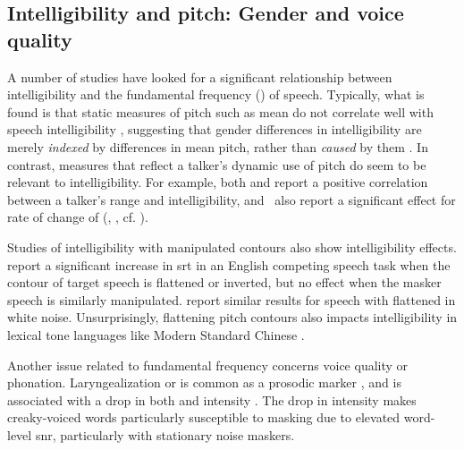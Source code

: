 \subsection[Intelligibility and pitch]{Intelligibility and pitch: Gender and voice quality\label{sec:IntelPitch}}
A number of studies have looked for a significant relationship between intelligibility and the fundamental frequency (\fo) of speech.  Typically, what is found is that static measures of pitch such as mean \fo{} do not correlate well with speech intelligibility \citep[\eg,][]{PichenyEtAl1986, BradlowEtAl1996, HazanMarkham2004, LuCooke2009}, suggesting that gender differences in intelligibility are merely {\em indexed} by differences in mean pitch, rather than {\em caused} by them \citep[cf. discussion in][]{BradlowEtAl1996}.  In contrast, measures that reflect a talker’s dynamic use of pitch do seem to be relevant to intelligibility.  For example, both \citet{BradlowEtAl1996} and \citet{McCloyEtAl2013} report a positive correlation between a talker’s \fo{} range and intelligibility, and \citeauthor{McCloyEtAl2013}\ also report a significant effect for rate of change of \fo{} (\aka, , cf. \citealt{GauthierEtAl2007b, GauthierEtAl2007a, GauthierEtAl2009}). %

Studies of intelligibility with manipulated \fo{} contours also show intelligibility effects.  \citet{BinnsCulling2007} report a significant increase in \ac{srt} in an English competing speech task when the \fo{} contour of target speech is flattened or inverted, but no effect when the masker speech is similarly manipulated.  \citet{WatsonSchlauch2008} report similar results for speech with flattened \fo{} in white noise.  Unsurprisingly, flattening pitch contours also impacts intelligibility in lexical tone languages like Modern Standard Chinese \citep{PatelEtAl2010}.


Another issue related to fundamental frequency concerns voice quality or phonation.  Laryngealization or  is common as a prosodic marker \citep{Lehiste1979, Kreiman1982, DilleyEtAl1996}, and is associated with a drop in both \fo{} and intensity \citep{GordonLadefoged2001}.  The drop in intensity makes creaky-voiced words particularly susceptible to masking due to elevated word-level \ac{snr}, particularly with stationary noise maskers.  %

